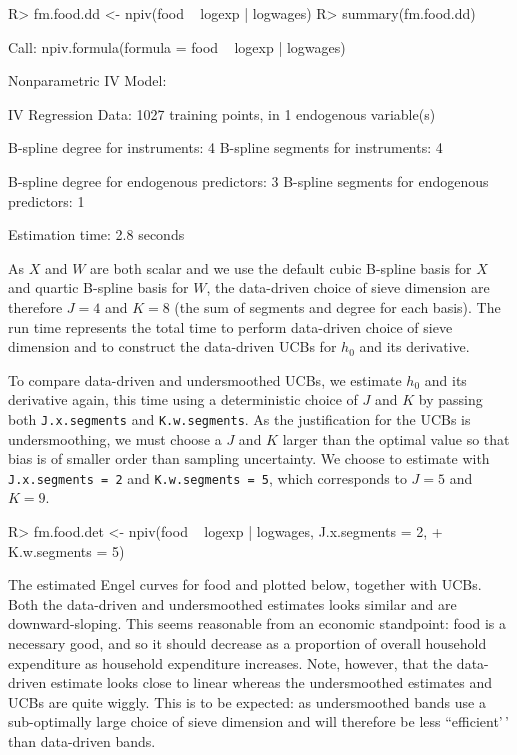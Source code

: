 \documentclass[
]{jss}
\begin{document}
\begin{CodeChunk}
\begin{CodeInput}
R> fm.food.dd <- npiv(food ~ logexp | logwages)
R> summary(fm.food.dd)
\end{CodeInput}
\begin{CodeOutput}
Call:
npiv.formula(formula = food ~ logexp | logwages)

Nonparametric IV Model:

IV Regression Data: 1027 training points, in 1 endogenous variable(s)

B-spline degree for instruments:             4
B-spline segments for instruments:           4

B-spline degree for endogenous predictors:   3
B-spline segments for endogenous predictors: 1

Estimation time: 2.8 seconds
\end{CodeOutput}
\end{CodeChunk}

As \(X\) and \(W\) are both scalar and we use the default cubic B-spline
basis for \(X\) and quartic B-spline basis for \(W\), the data-driven
choice of sieve dimension are therefore \(J = 4\) and \(K = 8\) (the sum
of segments and degree for each basis). The run time represents the
total time to perform data-driven choice of sieve dimension and to
construct the data-driven UCBs for \(h_0\) and its derivative.

To compare data-driven and undersmoothed UCBs, we estimate \(h_0\) and
its derivative again, this time using a deterministic choice of \(J\)
and \(K\) by passing both \texttt{J.x.segments} and
\texttt{K.w.segments}. As the justification for the UCBs is
undersmoothing, we must choose a \(J\) and \(K\) larger than the optimal
value so that bias is of smaller order than sampling uncertainty. We
choose to estimate with \texttt{J.x.segments\ =\ 2} and
\texttt{K.w.segments\ =\ 5}, which corresponds to \(J = 5\) and
\(K = 9\).

\begin{CodeChunk}
\begin{CodeInput}
R> fm.food.det <- npiv(food ~ logexp | logwages, J.x.segments = 2, 
+                         K.w.segments = 5)
\end{CodeInput}
\end{CodeChunk}

The estimated Engel curves for food and plotted below, together with
UCBs. Both the data-driven and undersmoothed estimates looks similar and
are downward-sloping. This seems reasonable from an economic standpoint:
food is a necessary good, and so it should decrease as a proportion of
overall household expenditure as household expenditure increases. Note,
however, that the data-driven estimate looks close to linear whereas the
undersmoothed estimates and UCBs are quite wiggly. This is to be
expected: as undersmoothed bands use a sub-optimally large choice of
sieve dimension and will therefore be less ``efficient'\,' than
data-driven bands.
\end{document}
